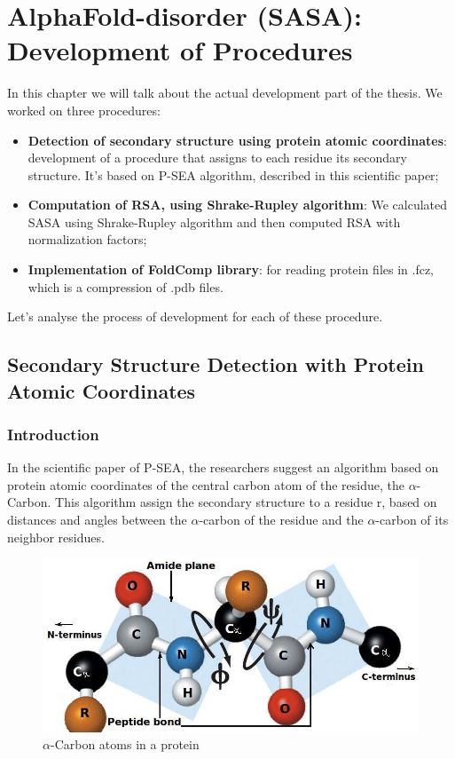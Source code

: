 \chapter{AlphaFold-disorder (SASA): Development of Procedures}
\label{chp:development}
In this chapter we will talk about the actual development part of the thesis. We worked on three procedures:
\begin{itemize}
    \item \textbf{Detection of secondary structure using protein atomic coordinates}: development of a procedure that assigns to each residue its secondary structure. It's based on P-SEA algorithm, described in this scientific paper\cite{psea};
    \item \textbf{Computation of RSA, using Shrake-Rupley algorithm}: We calculated SASA using Shrake-Rupley algorithm and then computed RSA with normalization factors;
    \item \textbf{Implementation of FoldComp library}: for reading protein files in .fcz, which is a compression of .pdb files.
\end{itemize}
Let's analyse the process of development for each of these procedure.

\section{Secondary Structure Detection with Protein Atomic Coordinates}
\subsection{Introduction}
In the scientific paper of P-SEA, the researchers suggest an algorithm based on protein atomic coordinates of the central carbon atom of the residue, the $\alpha$-Carbon.  This algorithm assign the secondary structure to a residue r, based on distances and angles between the $\alpha$-carbon of the residue and the $\alpha$-carbon of its neighbor residues.

\begin{figure}[h!]
    \centering
    \includegraphics[scale=0.6]{res/dev/alphacarbon.png}
    \caption{$\alpha$-Carbon atoms in a protein}
    \label{fig:acarbons}
\end{figure}

